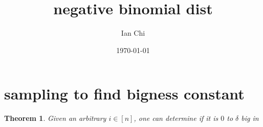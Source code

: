 \documentclass{article}
\title{negative binomial dist}
\author{Ian Chi}
\date{\today}
\newtheorem{theorem}{Theorem}[section]
\begin{document}
\maketitle

\section{sampling to find bigness constant}



\begin{theorem}
Given an arbitrary \(i\in[n]\), one can determine if it is \(0\) to \(\delta\) big in 
\end{theorem}
\end{document}
